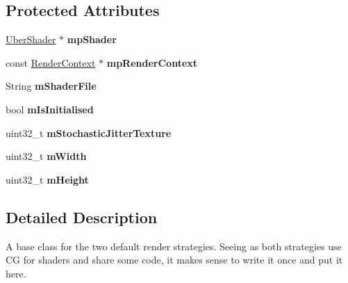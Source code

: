 \subsection*{\-Protected \-Attributes}
\begin{DoxyCompactItemize}
\item 
\hypertarget{class_verdi_1_1_default_render_strategy_abe92c99d9d0c2bedff0c7b47c9f9a145}{\hyperlink{class_verdi_1_1_uber_shader}{\-Uber\-Shader} $\ast$ {\bfseries mp\-Shader}}\label{class_verdi_1_1_default_render_strategy_abe92c99d9d0c2bedff0c7b47c9f9a145}

\item 
\hypertarget{class_verdi_1_1_default_render_strategy_aca01faa58aee81373bcf0853dbea352d}{const \hyperlink{class_verdi_1_1_render_context}{\-Render\-Context} $\ast$ {\bfseries mp\-Render\-Context}}\label{class_verdi_1_1_default_render_strategy_aca01faa58aee81373bcf0853dbea352d}

\item 
\hypertarget{class_verdi_1_1_default_render_strategy_aa56db35434627f4030d50ca9b8d90202}{\-String {\bfseries m\-Shader\-File}}\label{class_verdi_1_1_default_render_strategy_aa56db35434627f4030d50ca9b8d90202}

\item 
\hypertarget{class_verdi_1_1_default_render_strategy_aa7fccaf8ddd6f1a34a747b1f0acb5e63}{bool {\bfseries m\-Is\-Initialised}}\label{class_verdi_1_1_default_render_strategy_aa7fccaf8ddd6f1a34a747b1f0acb5e63}

\item 
\hypertarget{class_verdi_1_1_default_render_strategy_abf7dc97abcc92e4d1c79d461bf3d2f98}{uint32\-\_\-t {\bfseries m\-Stochastic\-Jitter\-Texture}}\label{class_verdi_1_1_default_render_strategy_abf7dc97abcc92e4d1c79d461bf3d2f98}

\item 
\hypertarget{class_verdi_1_1_default_render_strategy_a94de3846d2a68e914b4933fbcb7bbf29}{uint32\-\_\-t {\bfseries m\-Width}}\label{class_verdi_1_1_default_render_strategy_a94de3846d2a68e914b4933fbcb7bbf29}

\item 
\hypertarget{class_verdi_1_1_default_render_strategy_ab16cd2e5e04ba0b55f146c5a4da1770e}{uint32\-\_\-t {\bfseries m\-Height}}\label{class_verdi_1_1_default_render_strategy_ab16cd2e5e04ba0b55f146c5a4da1770e}

\end{DoxyCompactItemize}


\subsection{\-Detailed \-Description}
\-A base class for the two default render strategies. \-Seeing as both strategies use \-C\-G for shaders and share some code, it makes sense to write it once and put it here. 

